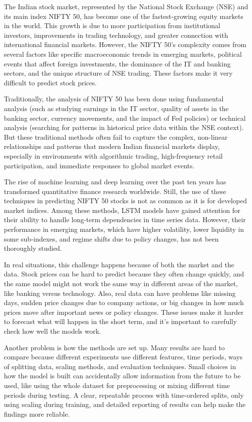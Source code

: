 \documentclass[conference]{IEEEtran}
\begin{document}
The Indian stock market, represented by the National Stock Exchange (NSE) and its main index NIFTY 50, has become one of the fastest-growing equity markets in the world. This growth is due to more participation from institutional investors, improvements in trading technology, and greater connection with international financial markets. However, the NIFTY 50's complexity comes from several factors like specific macroeconomic trends in emerging markets, political events that affect foreign investments, the dominance of the IT and banking sectors, and the unique structure of NSE trading. These factors make it very difficult to predict stock prices.

Traditionally, the analysis of NIFTY 50 has been done using fundamental analysis (such as studying earnings in the IT sector, quality of assets in the banking sector, currency movements, and the impact of Fed policies) or technical analysis (searching for patterns in historical price data within the NSE context). But these traditional methods often fail to capture the complex, non-linear relationships and patterns that modern Indian financial markets display, especially in environments with algorithmic trading, high-frequency retail participation, and immediate responses to global market events.

The rise of machine learning and deep learning over the past ten years has transformed quantitative finance research worldwide. Still, the use of these techniques in predicting NIFTY 50 stocks is not as common as it is for developed market indices. Among these methods, LSTM models have gained attention for their ability to handle long-term dependencies in time series data. However, their performance in emerging markets, which have higher volatility, lower liquidity in some sub-indexes, and regime shifts due to policy changes, has not been thoroughly studied.

In real situations, this challenge happens because of both the market and the data. Stock prices can be hard to predict because they often change quickly, and the same model might not work the same way in different areas of the market, like banking versus technology. Also, real data can have problems like missing days, sudden price changes due to company actions, or big changes in how much prices move after important news or policy changes. These issues make it harder to forecast what will happen in the short term, and it's important to carefully check how well the models work.

Another problem is how the methods are set up. Many results are hard to compare because different experiments use different features, time periods, ways of splitting data, scaling methods, and evaluation techniques. Small choices in how the model is built can accidentally allow information from the future to be used, like using the whole dataset for preprocessing or mixing different time periods during testing. A clear, repeatable process with time-ordered splits, only using scaling during training, and detailed reporting of results can help make the findings more reliable.
\end{document}
